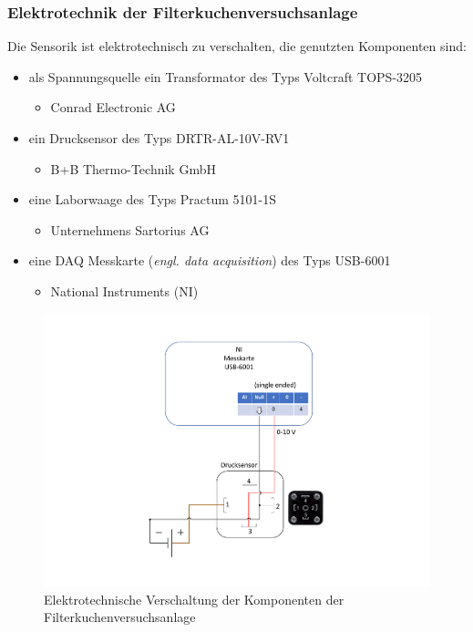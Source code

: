 \pagebreak
\subsubsection{Elektrotechnik der Filterkuchenversuchsanlage}

Die Sensorik ist elektrotechnisch zu verschalten, die genutzten Komponenten sind: 

\begin{itemize}
\item als Spannungsquelle ein Transformator des Typs Voltcraft TOPS-3205   
\begin{itemize}
\item Conrad Electronic AG
\end{itemize}

\item ein Drucksensor des Typs DRTR-AL-10V-RV1
\begin{itemize}
\item B+B Thermo-Technik GmbH
\end{itemize}


\item eine Laborwaage des Typs Practum 5101-1S
\begin{itemize}
\item Unternehmens Sartorius AG 
\end{itemize}

\item eine DAQ Messkarte (\textit{engl. data acquisition}) des Typs USB-6001 
\begin{itemize}
\item National Instruments (NI)
\end{itemize}
\end{itemize}



\begin{figure}[h!] %
\centering
\vspace{-3em}
\includegraphics[width=1.02\textwidth]{Bilder/Filterkuchen_Messtechnik.pdf}
\vspace{-4em}
 \caption[]{Elektrotechnische Verschaltung der Komponenten der Filterkuchenversuchsanlage}\label{fig:filterkuchenelektrotechnik}
\end{figure}


